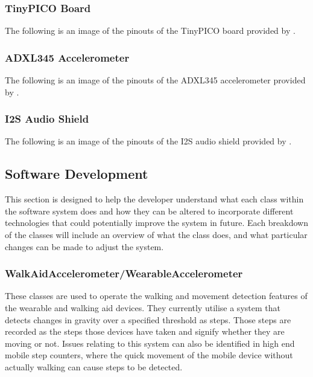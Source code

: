 			\subsubsection{TinyPICO Board}

				The following is an image of the pinouts of the TinyPICO board provided by \cite{tinypico}.

				

			\newpage
			\subsubsection{ADXL345 Accelerometer}

				The following is an image of the pinouts of the ADXL345 accelerometer provided by \cite{components101}.

				

			\newpage
			\subsubsection{I2S Audio Shield}

				The following is an image of the pinouts of the I2S audio shield provided by \cite{unexpected_maker}.

				

		\newpage
		\subsection{Software Development}

			This section is designed to help the developer understand what each class within the software system does and how they can be altered to incorporate different technologies that could potentially improve the system in future. Each breakdown of the classes will include an overview of what the class does, and what particular changes can be made to adjust the system.

			\subsubsection{WalkAidAccelerometer/WearableAccelerometer}

				These classes are used to operate the walking and movement detection features of the wearable and walking aid devices. They currently utilise a system that detects changes in gravity over a specified threshold as steps. Those steps are recorded as the steps those devices have taken and signify whether they are moving or not. Issues relating to this system can also be identified in high end mobile step counters, where the quick movement of the mobile device without actually walking can cause steps to be detected.

